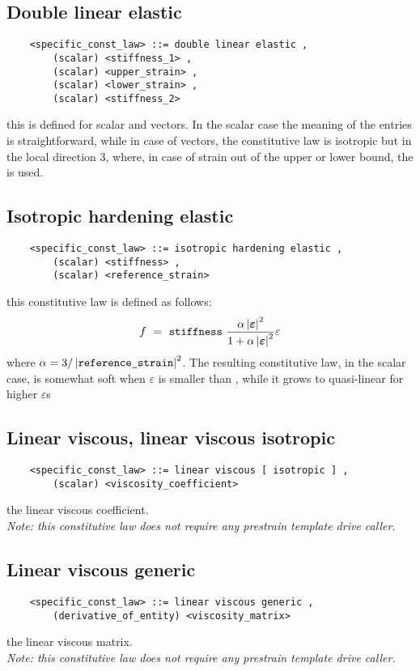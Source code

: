 \subsection{Double linear elastic}
\begin{verbatim}
    <specific_const_law> ::= double linear elastic ,
        (scalar) <stiffness_1> ,
        (scalar) <upper_strain> ,
        (scalar) <lower_strain> ,
        (scalar) <stiffness_2>
\end{verbatim}
this is defined for scalar and  vectors. In the scalar case the
meaning of the entries is straightforward, while in case of  vectors,
the constitutive law is isotropic but in the local direction 3, where, in
case of strain out of the upper or lower bound, the  is
used.

\subsection{Isotropic hardening elastic}
\begin{verbatim}
    <specific_const_law> ::= isotropic hardening elastic ,
        (scalar) <stiffness> ,
        (scalar) <reference_strain>
\end{verbatim}
this constitutive law is defined as follows:
\begin{displaymath}
    f \ = \ \texttt{stiffness} \ \frac{
        \alpha\left| \boldsymbol{\varepsilon} \right|^2
    }{
        1+\alpha\left| \boldsymbol{\varepsilon} \right|^2
    }\varepsilon
\end{displaymath}
where $ \alpha=3/\left| \texttt{reference\_strain} \right|^2 $. The resulting
constitutive law, in the scalar case, is somewhat soft when
$ \varepsilon $ is smaller than , while it grows to
quasi-linear for higher $ \varepsilon$s

\subsection{Linear viscous, linear viscous isotropic}
\begin{verbatim}
    <specific_const_law> ::= linear viscous [ isotropic ] , 
        (scalar) <viscosity_coefficient>
\end{verbatim}
the linear viscous coefficient. \\
{\em 
    Note: this constitutive law does not require any prestrain template
    drive caller.
}
  
\subsection{Linear viscous generic}
\begin{verbatim}
    <specific_const_law> ::= linear viscous generic , 
        (derivative_of_entity) <viscosity_matrix>
\end{verbatim}
the linear viscous matrix. \\
{\em 
    Note: this constitutive law does not require any prestrain template
    drive caller.
}
  
